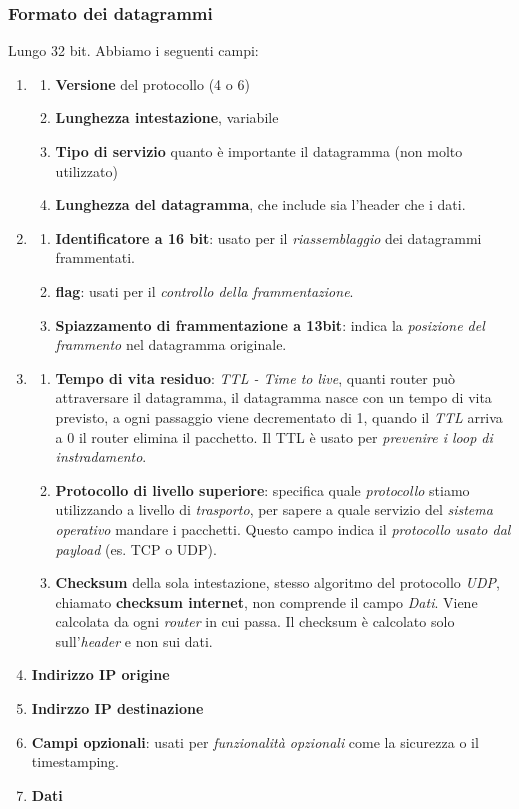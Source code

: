 \subsubsection{Formato dei datagrammi}
Lungo 32 bit. Abbiamo i seguenti campi:
\begin{enumerate}
  \item \begin{enumerate}
      \item \textbf{Versione} del protocollo (4 o 6)
      \item \textbf{Lunghezza intestazione}, variabile
      \item \textbf{Tipo di servizio} quanto è importante il datagramma (non molto utilizzato)
      \item \textbf{Lunghezza del datagramma}, che include sia l'header che i dati.
  \end{enumerate}
  \item \begin{enumerate}
      \item \textbf{Identificatore a 16 bit}: usato per il \textit{riassemblaggio} dei datagrammi frammentati.
      \item \textbf{flag}: usati per il \textit{controllo della frammentazione}.
      \item \textbf{Spiazzamento di frammentazione a 13bit}: indica la \textit{posizione del frammento} nel datagramma originale.
  \end{enumerate}
  \item \begin{enumerate}
      \item \textbf{Tempo di vita residuo}: \textit{TTL - Time to live}, quanti router può attraversare il datagramma, il datagramma nasce con un tempo di vita previsto, a ogni passaggio viene decrementato di 1, quando il \textit{TTL} arriva a 0 il router elimina il pacchetto. Il TTL è usato per \textit{prevenire i loop di instradamento}.
      \item \textbf{Protocollo di livello superiore}: specifica quale \textit{protocollo} stiamo utilizzando a livello di \textit{trasporto}, per sapere a quale servizio del \textit{sistema operativo} mandare i pacchetti. Questo campo indica il \textit{protocollo usato dal payload} (es. TCP o UDP).
      \item \textbf{Checksum} della sola intestazione, stesso algoritmo del protocollo \textit{UDP}, chiamato \textbf{checksum internet}, non comprende il campo \textit{Dati}. Viene calcolata da ogni \textit{router} in cui passa. Il checksum è calcolato solo sull'\textit{header} e non sui dati.
  \end{enumerate}
  \item \textbf{Indirizzo IP origine}
  \item \textbf{Indirzzo IP destinazione}
  \item \textbf{Campi opzionali}: usati per \textit{funzionalità opzionali} come la sicurezza o il timestamping.
  \item \textbf{Dati}
\end{enumerate}


